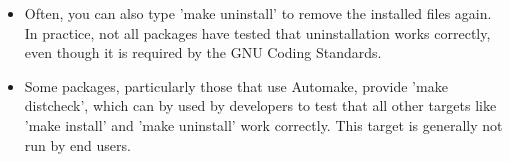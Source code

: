 \begin{itemize}
 \item Often, you can also type 'make uninstall' to remove the installed
 files again.  In practice, not all packages have tested that
 uninstallation works correctly, even though it is required by the
 GNU Coding Standards.
 
\item Some packages, particularly those that use Automake, provide 'make
 distcheck', which can by used by developers to test that all other
 targets like 'make install' and 'make uninstall' work correctly.
 This target is generally not run by end users.
\end{itemize}


